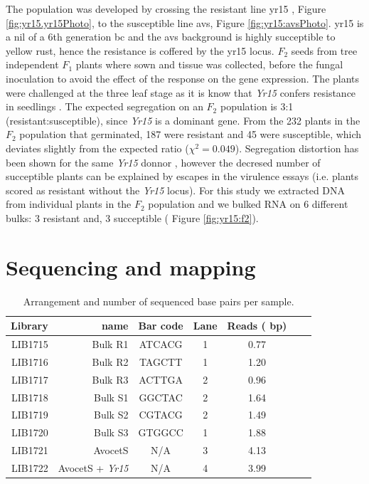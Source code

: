 
The population was developed by crossing the resistant line \gls{yr15} \citep{Wellings1998}, Figure \ref{fig:yr15.yr15Photo}, to the susceptible line \gls{avs}, Figure \ref{fig:yr15:avsPhoto}. 
\acrshort{yr15} is a \gls{nil} of a 6th generation \gls{bc} and the \acrshort{avs} background is highly succeptible to yellow rust, hence the resistance is coffered by the \acrshort{yr15} locus. 
$F_{2}$ seeds from tree independent $F_{1}$ plants where sown and tissue was collected, before the fungal inoculation to avoid the effect of the response on the gene expression.  
The plants were challenged at the three leaf stage as it is know that \textit{Yr15} confers resistance in seedlings \citep{Gerechter-Amitai1989}.
The expected segregation on an $F_{2}$ population is 3:1 (resistant:susceptible), since \textit{Yr15} is a dominant gene.
From the 232 plants in the $F_{2}$ population that germinated, 187 were resistant and 45 were susceptible, which deviates slightly from the expected ratio ($\chi^{2}=0.049$).
Segregation distortion has been shown for the same \textit{Yr15} donnor \citep{Randhawa2009}, however the decresed number of succeptible plants can be explained by escapes in the virulence essays (i.e. plants scored as resistant without the \textit{Yr15} locus).   For this study we extracted DNA from individual plants in the $F_{2}$ population and we bulked RNA on 6 different bulks: 3 resistant and, 3 succeptible ( Figure \ref{fig:yr15:f2}). 

\section{Sequencing and mapping} 

\begin{table}
\centering
\caption{Arrangement and number of sequenced base pairs per sample. }
\label{tab:yr15:reads}
\begin{tabular}{rrccccc}
\toprule
Library & name & Bar code & Lane   &  Reads (\e{8} bp)\\ 
\midrule
LIB1715 & Bulk R1 & ATCACG & 1 	& 0.77\\
LIB1716 & Bulk R2 & TAGCTT & 1 		& 1.20\\
LIB1717 & Bulk R3 & ACTTGA & 2 	& 0.96  \\ 
LIB1718 & Bulk S1 & GGCTAC & 2 	& 1.64   \\ 
LIB1719 & Bulk S2 & CGTACG & 2 	& 1.49  \\ 
LIB1720 & Bulk S3 & GTGGCC & 1 	&1.88  \\ 
LIB1721 & AvocetS & N/A & 3 		& 4.13 \\ 
LIB1722 & AvocetS + \textit{Yr15} & N/A & 4 	& 3.99  \\ 
\bottomrule
\end{tabular}
\end{table}

